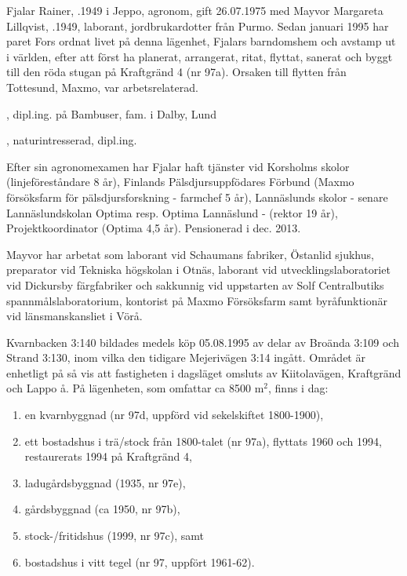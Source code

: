 


Fjalar Rainer, .1949 i Jeppo, agronom, gift 26.07.1975 med Mayvor Margareta Lillqvist, .1949, laborant, jordbrukardotter från Purmo. Sedan januari 1995 har paret Fors ordnat livet på denna lägenhet, Fjalars barndomshem och avstamp ut i världen, efter att först ha planerat, arrangerat, ritat, flyttat, sanerat och	byggt till den röda stugan på Kraftgränd 4 (nr 97a). Orsaken till flytten från Tottesund, Maxmo, var arbetsrelaterad.
\begin{jhchildren}
  \item {}, dipl.ing. på Bambuser, fam. i Dalby, Lund
  \item {}, naturintresserad, dipl.ing.
\end{jhchildren}

Efter sin agronomexamen har Fjalar haft tjänster vid Korsholms skolor (linjeföreståndare 8 år), Finlands Pälsdjursuppfödares Förbund (Maxmo försöksfarm för pälsdjursforskning - farmchef 5 år), Lannäslunds skolor - senare Lannäslundskolan Optima resp. Optima Lannäslund - (rektor 19 år), Projektkoordinator (Optima 4,5 år).	Pensionerad i dec. 2013.

Mayvor har arbetat som laborant vid Schaumans fabriker, Östanlid sjukhus, preparator vid Tekniska högskolan i Otnäs, laborant vid utvecklingslaboratoriet vid Dickursby färgfabriker och sakkunnig vid uppstarten av Solf Centralbutiks spannmålslaboratorium, kontorist på Maxmo Försöksfarm samt byråfunktionär vid länsmanskansliet i Vörå.

Kvarnbacken 3:140 bildades medels köp 05.08.1995 av delar av Broända 3:109 och Strand 3:130, inom vilka den tidigare Mejerivägen 3:14 ingått. Området är enhetligt på så vis att fastigheten i dagsläget omsluts av Kiitolavägen, Kraftgränd och Lappo å. På lägenheten, som omfattar ca 8500 m$^2$, finns i dag:
\begin{enumerate}
  \item en kvarnbyggnad (nr 97d, uppförd vid sekelskiftet 1800-1900),
  \item ett bostadshus i trä/stock från 1800-talet (nr 97a), flyttats 1960 och 1994, restaurerats 1994 på Kraftgränd 4,
  \item ladugårdsbyggnad (1935, nr 97e),
  \item gårdsbyggnad (ca 1950, nr 97b),
  \item stock-/fritidshus (1999, nr 97c), samt
  \item bostadshus i vitt tegel (nr 97, uppfört 1961-62).
\end{enumerate}

